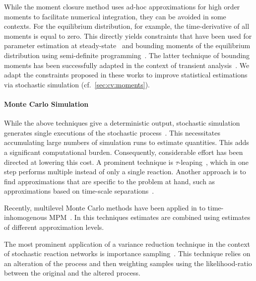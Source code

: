 While the moment closure method uses ad-hoc approximations for high
order moments to
facilitate numerical integration, they can be avoided in some contexts.
For the equilibrium distribution, for example, the time-derivative of
all moments is equal to zero.
This directly yields constraints that have been used for parameter estimation at
steady-state~\parencite{backenkohler2018moment}
and bounding moments of the equilibrium distribution using semi-definite
programming~\parencite{ghusinga2017estimating,ghusinga2017exact,kuntz2017rigorous}.
The latter technique of bounding moments has been successfully adapted in the
context of transient
analysis~\parencite{dowdy2018dynamic,sakurai2017convex,sakurai2019bounding}.
We adapt the constraints proposed in these works to improve
statistical estimations via stochastic
simulation (cf.\ \autoref{sec:cv:moments}).

\paragraph{Monte Carlo Simulation}
While the above techniques give a deterministic output, stochastic
simulation generates
single executions of the stochastic process~\parencite{gillespie1977exact}.
This necessitates accumulating large numbers of simulation runs to estimate
quantities.
This adds a significant computational burden. Consequently, considerable effort
has been directed at lowering this cost.
A prominent technique is $\tau$-leaping~\parencite{gillespie2001approximate},
which in one step performs multiple instead of only a single reaction.
Another approach is to find approximations that are specific to the
problem at hand,
such as approximations based on time-scale
separations~\parencite{cao2005slow,bortolussi2015efficient}.

Recently, multilevel Monte Carlo methods have been applied in to
time-inhomogenous
\ac{MPM}~\parencite{anderson2018low}. In this techniques estimates are combined
using estimates of different approximation levels.


The most prominent application of a variance reduction technique in the context
of stochastic reaction networks is importance
sampling~\parencite{kuwahara2008efficient}.
This technique relies on an alteration of the process and then weighting samples
using the likelihood-ratio between the original and the altered process.
%

